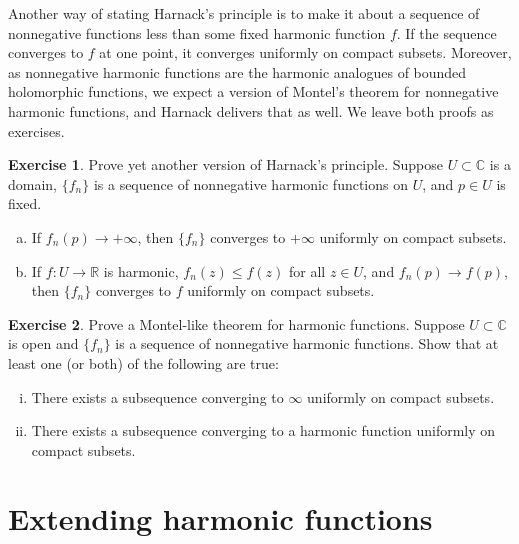 \documentclass[12pt,openany]{book}
\newcommand{\C}{{\mathbb{C}}}
\newcommand{\R}{{\mathbb{R}}}
\theoremstyle{plain}
\theoremstyle{remark}
\theoremstyle{definition}
\newenvironment{exbox}{%
    \def\FrameCommand{\vrule width 1pt \relax\hspace{10pt}}%
    \MakeFramed{\advance\hsize-\width\FrameRestore}%
}{%
    \endMakeFramed
}
\newenvironment{exparts}{%
    \leavevmode\begin{enumerate}[a),noitemsep,topsep=0pt,parsep=0pt,partopsep=0pt]
}{%
    \end{enumerate}
}
\theoremstyle{exercise}
\newtheorem{exercise}{Exercise}[section]
\theoremstyle{example}
\begin{document}
Another way of stating Harnack's principle is to make it about
a sequence of nonnegative functions less
than some fixed harmonic function $f$.  If the sequence converges to $f$ at
one point, it converges uniformly on compact subsets.  Moreover, as
nonnegative harmonic functions are the harmonic analogues of bounded holomorphic
functions, we expect a version of Montel's theorem for nonnegative harmonic
functions, and Harnack delivers that as well.  We leave both proofs as
exercises.

\begin{exbox}
\begin{exercise}
Prove yet another version of Harnack's principle.
Suppose $U \subset \C$ is a domain,
$\{ f_n \}$ is a sequence of nonnegative harmonic functions on
$U$, and $p \in U$ is fixed.
\begin{exparts}
\item
If $f_n(p) \to +\infty$, then $\{ f_n \}$ converges to $+\infty$ uniformly on
compact subsets.
\item
If $f \colon U \to \R$ is harmonic, $f_n(z) \leq f(z)$ for all $z \in U$,
and $f_n(p) \to f(p)$, then $\{ f_n \}$ converges to $f$ uniformly on
compact subsets.
\end{exparts}
\end{exercise}

\begin{exercise}
Prove a Montel-like theorem for harmonic functions.  Suppose $U \subset \C$
is open and $\{ f_n \}$ is a sequence of nonnegative harmonic functions.
Show that at least one (or both) of the following are true:
\begin{enumerate}[(i)]
\item
There exists a subsequence converging to $\infty$ uniformly on compact subsets.
\item
There exists a subsequence converging to a harmonic function
uniformly on compact subsets.
\end{enumerate}
\end{exercise}
\end{exbox}



\section{Extending harmonic functions}
\end{document}
